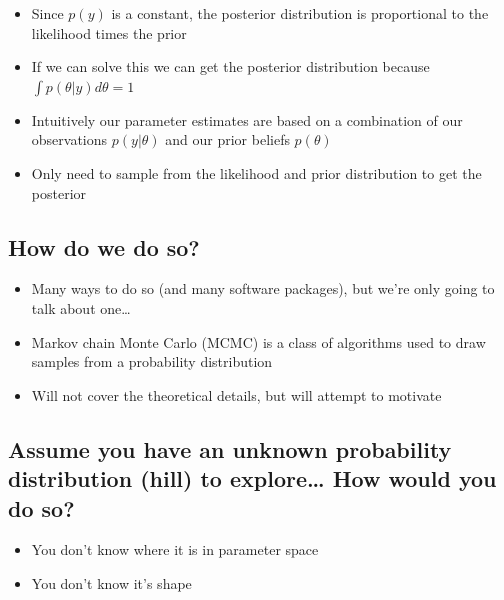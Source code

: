 \documentclass[
  letterpaper,
  DIV=11,
  numbers=noendperiod]{scrartcl}
\providecommand{\tightlist}{%
  \setlength{\itemsep}{0pt}\setlength{\parskip}{0pt}}\usepackage{longtable,booktabs,array}
\begin{document}
\large

\begin{itemize}
\tightlist
\item
  Since \(p(y)\) is a constant, the posterior distribution is
  proportional to the likelihood times the prior
\item
  If we can solve this we can get the posterior distribution because
  \(\int p(\theta|y)d\theta = 1\)
\item
  Intuitively our parameter estimates are based on a combination of our
  observations \(p(y|\theta)\) and our prior beliefs \(p(\theta)\)
\item
  Only need to sample from the likelihood and prior distribution to get
  the posterior
\end{itemize}

\normalsize

\hypertarget{how-do-we-do-so}{%
\subsection{How do we do so?}\label{how-do-we-do-so}}

\Large

\begin{itemize}
\tightlist
\item
  Many ways to do so (and many software packages), but we're only going
  to talk about one\ldots{}
\item
  Markov chain Monte Carlo (MCMC) is a class of algorithms used to draw
  samples from a probability distribution
\item
  Will not cover the theoretical details, but will attempt to motivate
\end{itemize}

\hypertarget{assume-you-have-an-unknown-probability-distribution-hill-to-explore-how-would-you-do-so}{%
\subsection{Assume you have an unknown probability distribution (hill)
to explore\ldots{} How would you do
so?}\label{assume-you-have-an-unknown-probability-distribution-hill-to-explore-how-would-you-do-so}}

\Large

\begin{itemize}
\tightlist
\item
  You don't know where it is in parameter space
\item
  You don't know it's shape
\end{itemize}
\end{document}
